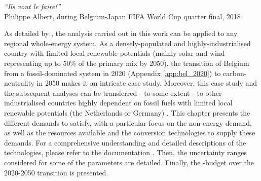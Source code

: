 \vspace{-0.2cm}
\begin{flushright}
\emph{``Ils vont le faire!''}\\
Philippe Albert, during Belgium-Japan FIFA World Cup quarter final, 2018
\end{flushright}
\vspace{0.4cm}
%
%
%

As detailed by \citet{limpens2024pathway}, the analysis carried out in this work can be applied to any regional whole-energy system. As a densely-populated and highly-industrialised country with limited local renewable potentials (\ie mainly solar and wind representing up to 50\% of the primary mix by 2050), the transition of Belgium from a fossil-dominated system in 2020 (Appendix \ref{app:bel_2020}) to carbon-neutrality in 2050 makes it an intricate case study. Moreover, this case study and the subsequent analyses can be transferred - to some extent - to other industrialised countries highly dependent on fossil fuels with limited local renewable potentials (\eg the Netherlands or Germany) \cite{dommisse2020modelling}. This chapter presents the different demands to satisfy, with a particular focus on the non-energy demand, as well as the resources available and the conversion technologies to supply these demands. For a comprehensive understanding and detailed descriptions of the technologies, please refer to the documentation \cite{readthedocs_pathway}. Then, the uncertainty ranges considered for some of the parameters are detailed. Finally, the -budget over the 2020-2050 transition is presented.

